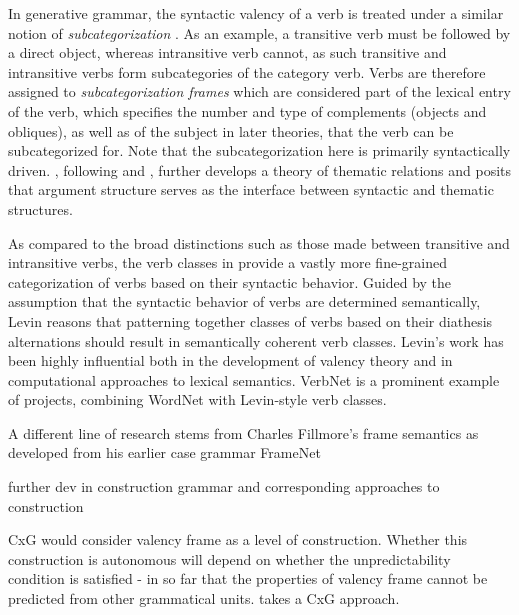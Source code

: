 In generative grammar, the syntactic valency of a verb is treated under a similar notion of \textit{subcategorization} \citep{chomsky1965a}. As an example, a transitive verb must be followed by a direct object, whereas intransitive verb cannot, as such transitive and intransitive verbs form subcategories of the category verb. Verbs are therefore assigned to \textit{subcategorization frames} which are considered part of the lexical entry of the verb, which specifies the number and type of complements (objects and obliques), as well as of the subject in later theories, that the verb can be subcategorized for. Note that the subcategorization here is primarily syntactically driven. \citet{jackendoff1972,jackendoff1987,jackendoff1992}, following \citet{katz1963} and \citet{gruber1962}, further develops a theory of thematic relations and posits that argument structure serves as the interface between syntactic and thematic structures.


As compared to the broad distinctions such as those made between transitive and intransitive verbs, the verb classes in \citet{levin1993} provide a vastly more fine-grained categorization of verbs based on their syntactic behavior. Guided by the assumption that the syntactic behavior of verbs are determined semantically, Levin reasons that patterning together classes of verbs based on their diathesis alternations should result in semantically coherent verb classes. Levin's work has been highly influential both in the development of valency theory and in computational approaches to lexical semantics. VerbNet \cite{kipper-schuler2005, kipper2006, kipper2008} is a prominent example of projects, combining WordNet \cite{fellbaum1998, miller1995} with Levin-style verb classes. 

A different line of research stems from Charles Fillmore's 
frame semantics \cite{fillmore1977, fillmore1977a, fillmore1982}
as developed from his earlier
case grammar \citep{fillmore1968,fillmore1970} 
FrameNet \citep{fillmore2015}

further dev in construction grammar and corresponding approaches to construction
\citet{goldberg1992,goldberg1995}

CxG would consider valency frame as a level of construction. Whether this construction is autonomous will depend on whether the unpredictability condition is satisfied - in so far that the properties of valency frame cannot be predicted from other grammatical units.
\citet{croft2012} takes a CxG approach. 


